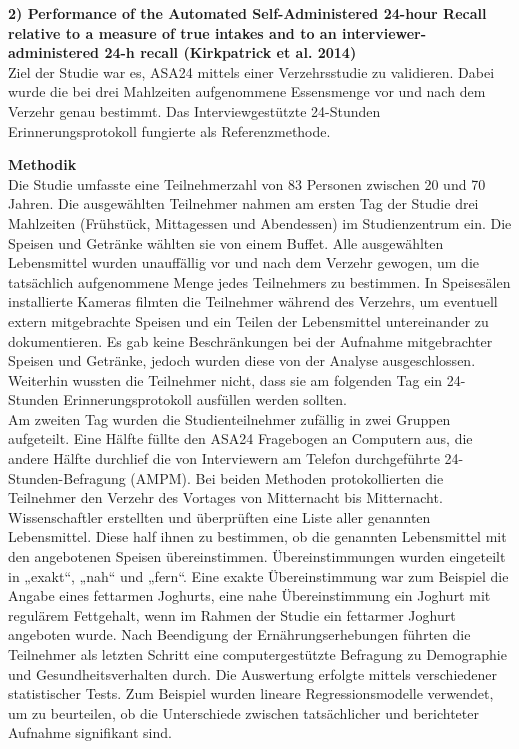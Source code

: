 \textbf{2) Performance of the Automated Self-Administered 24-hour Recall relative to a measure of true intakes and to an interviewer-administered 24-h recall (Kirkpatrick et al. 2014)}\\
Ziel der Studie war es, ASA24 mittels einer Verzehrsstudie zu validieren. Dabei wurde die bei drei Mahlzeiten aufgenommene Essensmenge vor und nach dem Verzehr genau bestimmt. Das Interviewgestützte 24-Stunden Erinnerungsprotokoll fungierte als Referenzmethode.

\textbf{Methodik}\\
Die Studie umfasste eine Teilnehmerzahl von 83 Personen zwischen 20 und 70 Jahren. Die ausgewählten Teilnehmer nahmen am ersten Tag der Studie drei Mahlzeiten (Frühstück, Mittagessen und Abendessen) im Studienzentrum ein. Die Speisen und Getränke wählten sie von einem Buffet. Alle ausgewählten Lebensmittel wurden unauffällig vor und nach dem Verzehr gewogen, um die tatsächlich aufgenommene Menge jedes Teilnehmers zu bestimmen. In Speisesälen installierte Kameras filmten die Teilnehmer während des Verzehrs, um eventuell extern mitgebrachte Speisen und ein Teilen der Lebensmittel untereinander zu dokumentieren. Es gab keine Beschränkungen bei der Aufnahme mitgebrachter Speisen und Getränke, jedoch wurden diese von der Analyse ausgeschlossen. Weiterhin wussten die Teilnehmer nicht, dass sie am folgenden Tag ein 24-Stunden Erinnerungsprotokoll ausfüllen werden sollten. \\
Am zweiten Tag wurden die Studienteilnehmer zufällig in zwei Gruppen aufgeteilt. Eine Hälfte füllte den ASA24 Fragebogen an Computern aus, die andere Hälfte durchlief die von Interviewern am Telefon durchgeführte 24-Stunden-Befragung (AMPM). Bei beiden Methoden protokollierten die Teilnehmer den Verzehr des Vortages von Mitternacht bis Mitternacht. Wissenschaftler erstellten und überprüften eine Liste aller genannten Lebensmittel. Diese half ihnen zu bestimmen, ob die genannten Lebensmittel mit den angebotenen Speisen übereinstimmen. Übereinstimmungen  wurden eingeteilt in „exakt“, „nah“ und „fern“. Eine exakte Übereinstimmung war zum Beispiel die Angabe eines fettarmen Joghurts, eine nahe Übereinstimmung ein Joghurt mit regulärem Fettgehalt, wenn im Rahmen der Studie ein fettarmer Joghurt angeboten wurde.  Nach Beendigung der Ernährungserhebungen führten die Teilnehmer als letzten Schritt eine computergestützte Befragung zu Demographie und Gesundheitsverhalten durch. 
Die Auswertung erfolgte mittels verschiedener statistischer Tests. Zum Beispiel wurden lineare Regressionsmodelle verwendet, um zu beurteilen, ob die Unterschiede zwischen tatsächlicher und berichteter Aufnahme signifikant sind.

